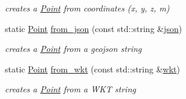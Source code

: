 \begin{DoxyCompactItemize}
\begin{DoxyCompactList}\small\item\em creates a \hyperlink{classsimo_1_1shapes_1_1_point}{Point} from coordinates (x, y, z, m) \end{DoxyCompactList}\item 
static \hyperlink{classsimo_1_1shapes_1_1_point}{Point} \hyperlink{classsimo_1_1shapes_1_1_point_a7de22a22436ff219a0714602d865b723}{from\-\_\-json} (const std\-::string \&\hyperlink{classsimo_1_1shapes_1_1_point_ab16bf7c8f22a3fbd0df4e8a7407eeda5}{json})
\begin{DoxyCompactList}\small\item\em creates a \hyperlink{classsimo_1_1shapes_1_1_point}{Point} from a geojson string \end{DoxyCompactList}\item 
static \hyperlink{classsimo_1_1shapes_1_1_point}{Point} \hyperlink{classsimo_1_1shapes_1_1_point_aa140e02a04b52bf5739a761528dfd8e9}{from\-\_\-wkt} (const std\-::string \&\hyperlink{classsimo_1_1shapes_1_1_point_a4134ec6fcf72ca4d822a9a70788dee40}{wkt})
\begin{DoxyCompactList}\small\item\em creates a \hyperlink{classsimo_1_1shapes_1_1_point}{Point} from a W\-K\-T string \end{DoxyCompactList}\end{DoxyCompactItemize}
